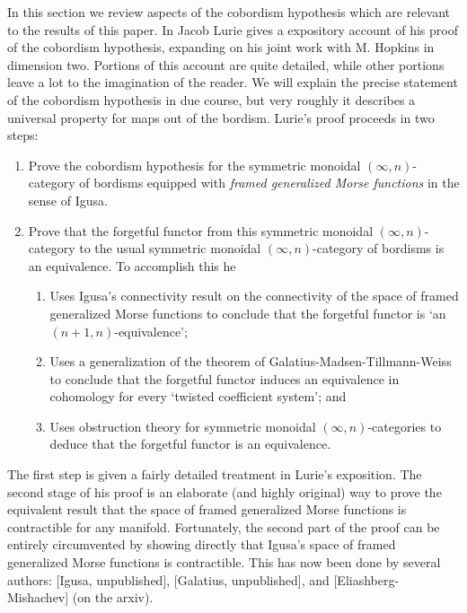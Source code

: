 \documentclass{amsart}
\begin{document}
In this section we review aspects of the cobordism hypothesis which are relevant to the results of this paper. In \cite{lurie-ch}     Jacob Lurie gives a expository account of his proof of the cobordism hypothesis, expanding on his joint work with M. Hopkins in dimension two. Portions of this account are quite detailed, while other portions leave a lot to the imagination of the reader. We will explain the precise statement of the cobordism hypothesis in due course, but very roughly it describes a universal property for maps out of the bordism. Lurie's proof proceeds in two steps:
\begin{enumerate}
	\item Prove the cobordism hypothesis for the symmetric monoidal $(\infty,n)$-category of bordisms equipped with {\em framed generalized Morse functions} in the sense of Igusa.
	\item Prove that the forgetful functor from this symmetric monoidal $(\infty,n)$-category to the usual symmetric monoidal $(\infty,n)$-category of bordisms is an equivalence. To accomplish this he
	\begin{enumerate}
		\item Uses Igusa's connectivity result on the connectivity of the space of framed generalized Morse functions to conclude that the forgetful functor is `an $(n+1, n)$-equivalence';
		\item Uses a generalization of the theorem of Galatius-Madsen-Tillmann-Weiss to conclude that the forgetful functor induces an equivalence in cohomology for every `twisted coefficient system'; and 
		\item Uses obstruction theory for symmetric monoidal $(\infty,n)$-categories to deduce that the forgetful functor is an equivalence. 
	\end{enumerate}
\end{enumerate}
The first step is given a fairly detailed treatment in Lurie's exposition.
The second stage of his proof is an elaborate (and highly original) way to prove the equivalent result that the space of framed generalized Morse functions is contractible for any manifold. Fortunately, the second part of the proof can be entirely circumvented by showing directly that Igusa's space of framed generalized Morse functions is contractible. This has now been done by several authors: [Igusa, unpublished], [Galatius, unpublished], and [Eliashberg-Mishachev] (on the arxiv).  
\end{document}
